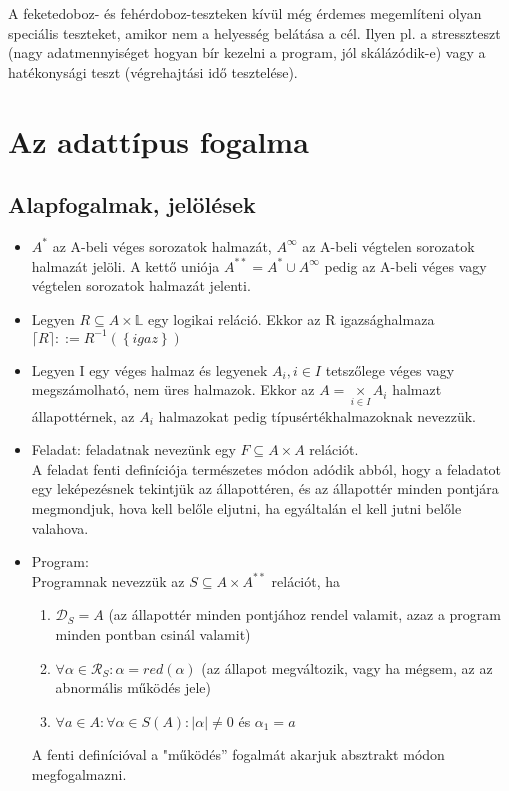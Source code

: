 \documentclass[margin=0px]{article}
\begin{document}
A feketedoboz- és fehérdoboz-teszteken kívül még érdemes megemlíteni olyan speciális teszteket, amikor nem a helyesség belátása a cél. Ilyen pl. a stresszteszt (nagy adatmennyiséget hogyan bír kezelni a program, jól skálázódik-e) vagy a hatékonysági teszt (végrehajtási idő tesztelése).

\section{Az adattípus fogalma}

\subsection{Alapfogalmak, jelölések}

\begin{itemize}

    \item	$A^{*}$ az A-beli véges sorozatok halmazát, $A^{\infty}$ az A-beli végtelen sorozatok halmazát jelöli.
          A kettő uniója $A^{**} = A^{*} \cup A^{\infty}$ pedig az A-beli véges vagy végtelen sorozatok halmazát jelenti.

    \item	Legyen $R \subseteq A \times \mathbb{L}$ egy logikai reláció. Ekkor az R igazsághalmaza
          $\lceil R \rceil ::= R^{-1}(\left\{{igaz}\right\}) $

    \item	Legyen I egy véges halmaz és legyenek $A_{i}, i \in I$ tetszőlege véges vagy megszámolható, nem üres halmazok.
          Ekkor az $A = \underset{i \in I}{\times} A_{i}$ halmazt állapottérnek, az $A_{i}$ halmazokat pedig típusértékhalmazoknak nevezzük.

    \item	Feladat: feladatnak nevezünk egy $F \subseteq A \times A$ relációt.\\
          A feladat fenti definíciója természetes módon adódik abból, hogy a feladatot egy
          leképezésnek tekintjük az állapottéren, és az állapottér minden pontjára megmondjuk,
          hova kell belőle eljutni, ha egyáltalán el kell jutni belőle valahova.

    \item Program:\\
          Programnak nevezzük az $S \subseteq A \times A^{**}$ relációt, ha
          \begin{enumerate}
              \item	$\mathcal{D}_{S}=A$ (az állapottér minden pontjához rendel valamit, azaz a program minden pontban csinál valamit)
              \item	$\forall \alpha \in \mathcal{R}_{S} : \alpha = red(\alpha)$ (az állapot megváltozik, vagy ha mégsem, az az abnormális működés jele)
              \item	$\forall a \in A : \forall \alpha \in S(A) : |\alpha| \not = 0$ és $\alpha_{1}=a$
          \end{enumerate}
          \noindent A fenti definícióval a "működés” fogalmát akarjuk absztrakt módon megfogalmazni.

\end{itemize}
\end{document}
